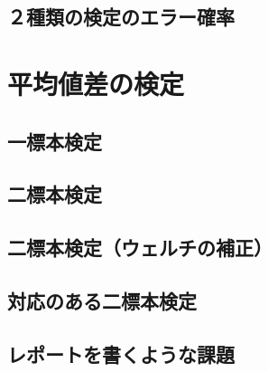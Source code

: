 \documentclass[
  a4paper,
]{ltjsbook}
\begin{document}
\hypertarget{ux7a2eux985eux306eux691cux5b9aux306eux30a8ux30e9ux30fcux78baux7387}{%
\section{２種類の検定のエラー確率}\label{ux7a2eux985eux306eux691cux5b9aux306eux30a8ux30e9ux30fcux78baux7387}}


\hypertarget{ux5e73ux5747ux5024ux5deeux306eux691cux5b9a}{%
\chapter{平均値差の検定}\label{ux5e73ux5747ux5024ux5deeux306eux691cux5b9a}}

\hypertarget{ux4e00ux6a19ux672cux691cux5b9a}{%
\section{一標本検定}\label{ux4e00ux6a19ux672cux691cux5b9a}}

\hypertarget{ux4e8cux6a19ux672cux691cux5b9a}{%
\section{二標本検定}\label{ux4e8cux6a19ux672cux691cux5b9a}}

\hypertarget{ux4e8cux6a19ux672cux691cux5b9aux30a6ux30a7ux30ebux30c1ux306eux88dcux6b63}{%
\section{二標本検定（ウェルチの補正）}\label{ux4e8cux6a19ux672cux691cux5b9aux30a6ux30a7ux30ebux30c1ux306eux88dcux6b63}}

\hypertarget{ux5bfeux5fdcux306eux3042ux308bux4e8cux6a19ux672cux691cux5b9a}{%
\section{対応のある二標本検定}\label{ux5bfeux5fdcux306eux3042ux308bux4e8cux6a19ux672cux691cux5b9a}}

\hypertarget{ux30ecux30ddux30fcux30c8ux3092ux66f8ux304fux3088ux3046ux306aux8ab2ux984c}{%
\section{レポートを書くような課題}\label{ux30ecux30ddux30fcux30c8ux3092ux66f8ux304fux3088ux3046ux306aux8ab2ux984c}}
\end{document}
